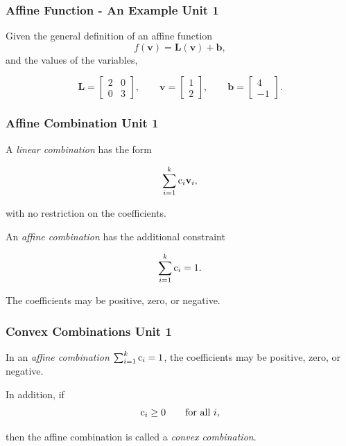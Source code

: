 \documentclass[12pt]{beamer}
\newcommand{\FrameTitle}[2]{\frametitle{#1 \hfill \small\textnormal{\textcolor{midgray}{#2}}}}
\newcommand{\vsp}{\vspace*{1em}}
\newcommand{\Matrix}[1]{\textbf{#1}}
\newcommand{\Vector}[1]{\textbf{#1}}
\newcommand{\Scalar}[1]{\textnormal{#1}}
\begin{document}
\begin{frame}\FrameTitle{Affine Function - An Example}{Unit 1}
    Given the general definition of an affine function
    \[
        f(\Vector{v}) = \Matrix{L}(\Vector{v}) + \Vector{b},
    \]
    and the values of the variables,

    \[
        \Matrix{L} =
            \begin{bmatrix}
                2 & 0\\
                0 & 3
            \end{bmatrix},
        \qquad
        \Vector{v} =
            \begin{bmatrix}
            1\\
            2
            \end{bmatrix},
        \qquad
        \Vector{b} =
            \begin{bmatrix}
                4\\
                -1
            \end{bmatrix}.
        \]

        \color{question}{caculate the value of the function $f$.}
\end{frame}


\begin{frame}\FrameTitle{Affine Combination}{Unit 1}
A \emph{linear combination} has the form

\[
    \sum_{i=1}^{k}\Scalar{c}_i\Vector{v}_i,
\]

with no restriction on the coefficients.

\vsp

An \emph{affine combination} has the additional constraint

\[
    \sum_{i=1}^{k}\Scalar{c}_i = 1.
\]

The coefficients may be positive, zero, or negative.
\end{frame}

\begin{frame}\FrameTitle{Convex Combinations}{Unit 1}
In an \emph{affine combination} $\sum_{i=1}^{k}\Scalar{c}_i = 1$,
the coefficients may be positive, zero, or negative.

\vsp\vsp

In addition, if
\[
    \Scalar{c}_i \geq 0 \qquad\text{for all }i,
\]

then the affine combination is called a \emph{convex combination}.
\end{frame}
\end{document}
